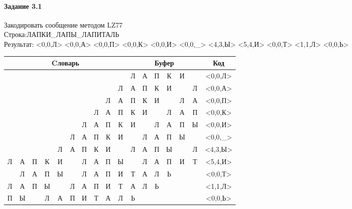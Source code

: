 \documentclass[a4paper, 12pt]{article}
\begin{document}
\pagebreak
\paragraph{Задание 3.1}

Закодировать сообщение методом LZ77\\
Строка:ЛАПКИ\_ЛАПЫ\_ЛАПИТАЛЬ\\
Результат: <0,0,Л> <0,0,А> <0,0,П> <0,0,К> <0,0,И> <0,0,\_> <4,3,Ы> <5,4,И> <0,0,Т> <1,1,Л> <0,0,Ь>\\
\begin{table}[h!]
\centering
\begin{tabular}{|c|c|c|c|c|c|c|c|c|c|c|c|c|c|c|c|c|} 
\hline
\multicolumn{10}{|c|}{Cловарь} & \multicolumn{6}{c|}{Буфер} & Код  \\ \hline
  &   &   &   &   &   &   &   &   &   & \cellcolor[HTML]{8CE4F6} Л & А & П & К & И &   & <0,0,Л>
\\ \hline
  &   &   &   &   &   &   &   &   & Л & \cellcolor[HTML]{8CE4F6} А & П & К & И &   & Л & <0,0,А>
\\ \hline
  &   &   &   &   &   &   &   & Л & А & \cellcolor[HTML]{8CE4F6} П & К & И &   & Л & А & <0,0,П>
\\ \hline
  &   &   &   &   &   &   & Л & А & П & \cellcolor[HTML]{8CE4F6} К & И &   & Л & А & П & <0,0,К>
\\ \hline
  &   &   &   &   &   & Л & А & П & К & \cellcolor[HTML]{8CE4F6} И &   & Л & А & П & Ы & <0,0,И>
\\ \hline
  &   &   &   &   & Л & А & П & К & И & \cellcolor[HTML]{8CE4F6}   & Л & А & П & Ы &   & <0,0,\_>
\\ \hline
  &   &   &   & \cellcolor[HTML]{FFFF00} Л & \cellcolor[HTML]{FFFF00} А & \cellcolor[HTML]{FFFF00} П & К & И &   & \cellcolor[HTML]{FFFF00} Л & \cellcolor[HTML]{FFFF00} А & \cellcolor[HTML]{FFFF00} П & \cellcolor[HTML]{8CE4F6} Ы &   & Л & <4,3,Ы>
\\ \hline
Л & А & П & К & И & \cellcolor[HTML]{FFFF00}   & \cellcolor[HTML]{FFFF00} Л & \cellcolor[HTML]{FFFF00} А & \cellcolor[HTML]{FFFF00} П & Ы & \cellcolor[HTML]{FFFF00}   & \cellcolor[HTML]{FFFF00} Л & \cellcolor[HTML]{FFFF00} А & \cellcolor[HTML]{FFFF00} П & \cellcolor[HTML]{8CE4F6} И & Т & <5,4,И>
\\ \hline
  & Л & А & П & Ы &   & Л & А & П & И & \cellcolor[HTML]{8CE4F6} Т & А & Л & Ь &   &   & <0,0,Т>
\\ \hline
Л & \cellcolor[HTML]{FFFF00} А & П & Ы &   & Л & А & П & И & Т & \cellcolor[HTML]{FFFF00} А & \cellcolor[HTML]{8CE4F6} Л & Ь &   &   &   & <1,1,Л>
\\ \hline
П & Ы &   & Л & А & П & И & Т & А & Л & \cellcolor[HTML]{8CE4F6} Ь &   &   &   &   &   & <0,0,Ь>
\\ \hline
\end{tabular}
\end{table}
\end{document}

